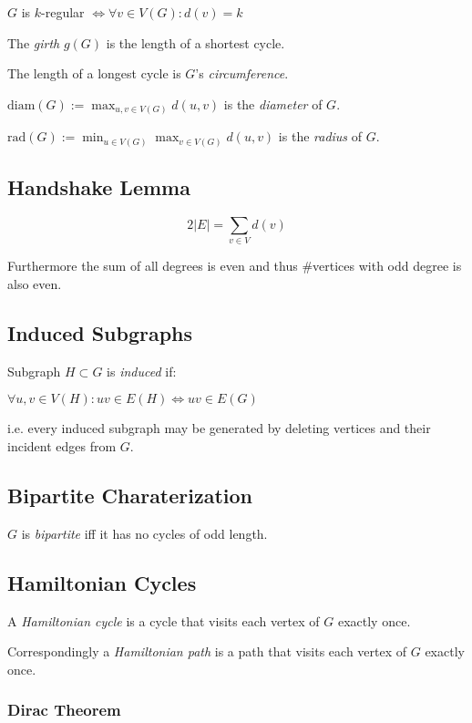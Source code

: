 \spacing

$G$ is $k$-regular $\iff \forall v \in V(G) : d(v) = k$

The \emph{girth} $g(G)$ is the length of a shortest cycle.

The length of a longest cycle is $G$'s \emph{circumference}.

\spacing

$\text{diam}(G) := \displaystyle\max_{u,v \in V(G)} d(u,v)$ is the \emph{diameter} of $G$.

\spacing

$\text{rad}(G) := \displaystyle\min_{u \in V(G)} \max_{v \in V(G)} d(u,v)$ is the \emph{radius} of $G$.

\subsection*{Handshake Lemma}

$$2|E| = \sum_{v \in V} d(v)$$

Furthermore the sum of all degrees is even and thus \#vertices with odd degree is also even.

\subsection*{Induced Subgraphs}

Subgraph $H \subset G$ is \emph{induced} if:

$\forall u, v \in V(H) : uv \in E(H) \iff uv \in E(G)$

i.e. every induced subgraph may be generated by deleting vertices and their incident edges from $G$.

\subsection*{Bipartite Charaterization}

$G$ is \emph{bipartite} iff it has no cycles of odd length.

\subsection*{Hamiltonian Cycles}

A \emph{Hamiltonian cycle} is a cycle that visits each vertex of $G$ exactly once.

Correspondingly a \emph{Hamiltonian path} is a path that visits each vertex of $G$ exactly once.

\subsubsection*{Dirac Theorem}

